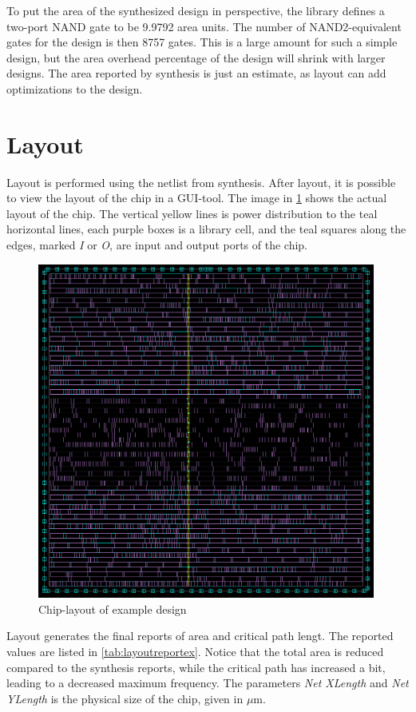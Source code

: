 To put the area of the synthesized design in perspective, the library defines a two-port NAND gate to be 9.9792 area units. The number of NAND2-equivalent gates for the design is then 8757 gates. This is a large amount for such a simple design, but the area overhead percentage of the design will shrink with larger designs. The area reported by synthesis is just an estimate, as layout can add optimizations to the design.
\section{Layout}
Layout is performed using the netlist from synthesis. After layout, it is possible to view the layout of the chip in a GUI-tool. The image in \cref{fig:layoutcircuit} shows the actual layout of the chip. The vertical yellow lines is power distribution to the teal horizontal lines, each purple boxes is a library cell, and the teal squares along the edges, marked \textit{I} or \textit{O}, are input and output ports of the chip. 
\begin{figure}[hbpt]
\centering
\includegraphics[width=0.99\textwidth]{../figs/LayoutCircuit.png}
\caption{\label{fig:layoutcircuit}Chip-layout of example design}
\end{figure}
Layout generates the final reports of area and critical path lengt. The reported values are listed in \cref{tab:layoutreportex}. Notice that the total area is reduced compared to the synthesis reports, while the critical path has increased a bit, leading to a decreased maximum frequency. The parameters \textit{Net XLength} and \textit{Net YLength} is the physical size of the chip, given in $\mu$m.

